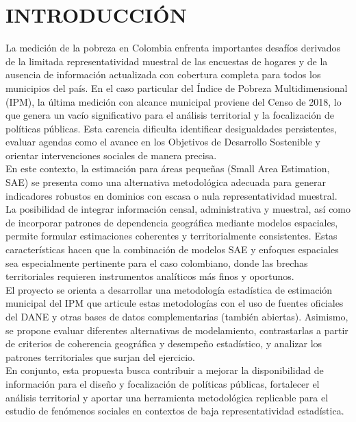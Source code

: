 \chapter{\textbf{INTRODUCCIÓN}}
La medición de la pobreza en Colombia enfrenta importantes desafíos derivados de la limitada
representatividad muestral de las encuestas de hogares y de la ausencia de información actualizada con
cobertura completa para todos los municipios del país. En el caso particular del Índice de Pobreza
Multidimensional (IPM), la última medición con alcance municipal proviene del Censo de 2018, lo que
genera un vacío significativo para el análisis territorial y la focalización de políticas públicas. Esta carencia dificulta identificar desigualdades persistentes, evaluar agendas como el avance en los Objetivos de Desarrollo Sostenible y orientar intervenciones sociales de manera precisa. \\

\setlength{\parindent}{2em} En este contexto, la estimación para áreas pequeñas (Small Area Estimation, SAE) se presenta como una alternativa metodológica adecuada para generar indicadores robustos en dominios con escasa o nula representatividad muestral. La posibilidad de integrar información censal, administrativa y muestral, así como de incorporar patrones de dependencia geográfica mediante modelos espaciales, permite formular estimaciones coherentes y territorialmente consistentes. Estas características hacen que la combinación de modelos SAE y enfoques espaciales sea especialmente pertinente para el caso colombiano, donde las brechas territoriales requieren instrumentos analíticos más finos y oportunos. \\

\setlength{\parindent}{2em} El proyecto se orienta a desarrollar una metodología estadística de estimación municipal del IPM que articule estas metodologías con el uso de fuentes oficiales del DANE y otras bases de datos
complementarias (también abiertas). Asimismo, se propone evaluar diferentes alternativas de modelamiento, contrastarlas a partir de criterios de coherencia geográfica y desempeño estadístico, y analizar los patrones territoriales que surjan del ejercicio. \\

\setlength{\parindent}{2em} En conjunto, esta propuesta busca contribuir a mejorar la disponibilidad de información para el diseño y focalización de políticas públicas, fortalecer el análisis territorial y aportar una herramienta metodológica replicable para el estudio de fenómenos sociales en contextos de baja representatividad estadística.